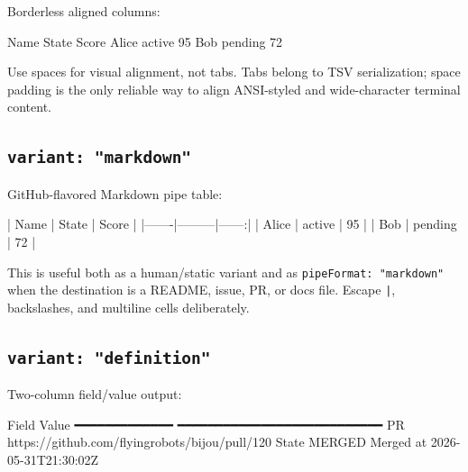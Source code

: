 Borderless aligned columns:

\begin{CodeBlock}
Name       State     Score
Alice      active    95
Bob        pending   72
\end{CodeBlock}

Use spaces for visual alignment, not tabs. Tabs belong to TSV serialization; space padding is the only reliable way to align ANSI-styled and wide-character terminal content.

\subsection{\texorpdfstring{\texttt{v\allowbreak{}a\allowbreak{}r\allowbreak{}i\allowbreak{}a\allowbreak{}n\allowbreak{}t\allowbreak{}:\allowbreak{} \allowbreak{}"\allowbreak{}m\allowbreak{}a\allowbreak{}r\allowbreak{}k\allowbreak{}d\allowbreak{}o\allowbreak{}w\allowbreak{}n\allowbreak{}"}}{}}\label{record-133-variant-markdown}

GitHub-flavored Markdown pipe table:

\begin{CodeBlock}
| Name  | State   | Score |
|-------|---------|------:|
| Alice | active  |    95 |
| Bob   | pending |    72 |
\end{CodeBlock}

This is useful both as a human/static variant and as \texttt{p\allowbreak{}i\allowbreak{}p\allowbreak{}e\allowbreak{}F\allowbreak{}o\allowbreak{}r\allowbreak{}m\allowbreak{}a\allowbreak{}t\allowbreak{}:\allowbreak{} \allowbreak{}"\allowbreak{}m\allowbreak{}a\allowbreak{}r\allowbreak{}k\allowbreak{}d\allowbreak{}o\allowbreak{}w\allowbreak{}n\allowbreak{}"} when the destination is a README, issue, PR, or docs file. Escape \texttt{|}, backslashes, and multiline cells deliberately.

\subsection{\texorpdfstring{\texttt{v\allowbreak{}a\allowbreak{}r\allowbreak{}i\allowbreak{}a\allowbreak{}n\allowbreak{}t\allowbreak{}:\allowbreak{} \allowbreak{}"\allowbreak{}d\allowbreak{}e\allowbreak{}f\allowbreak{}i\allowbreak{}n\allowbreak{}i\allowbreak{}t\allowbreak{}i\allowbreak{}o\allowbreak{}n\allowbreak{}"}}{}}\label{record-133-variant-definition}

Two-column field/value output:

\begin{CodeBlock}
Field          Value
━━━━━━━━━━━━━  ━━━━━━━━━━━━━━━━━━━━━━━━━━━
PR             https://github.com/flyingrobots/bijou/pull/120
State          MERGED
Merged at      2026-05-31T21:30:02Z
\end{CodeBlock}

